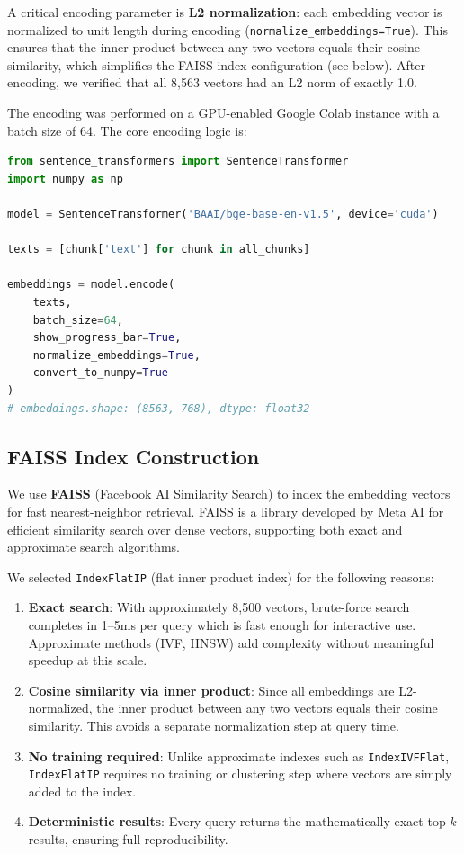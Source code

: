 \documentclass[10pt, letterpaper]{article}
\begin{document}
A critical encoding parameter is \textbf{L2 normalization}: each embedding vector is
normalized to unit length during encoding (\texttt{normalize\_embeddings=True}). This
ensures that the inner product between any two vectors equals their cosine similarity,
which simplifies the FAISS index configuration (see below). After encoding, we verified
that all 8,563 vectors had an L2 norm of exactly 1.0.

The encoding was performed on a GPU-enabled Google Colab instance with a batch size
of 64. The core encoding logic is:

\begin{lstlisting}[language=Python, caption=Encoding all chunks into normalized dense vectors]
from sentence_transformers import SentenceTransformer
import numpy as np

model = SentenceTransformer('BAAI/bge-base-en-v1.5', device='cuda')

texts = [chunk['text'] for chunk in all_chunks]

embeddings = model.encode(
    texts,
    batch_size=64,
    show_progress_bar=True,
    normalize_embeddings=True,
    convert_to_numpy=True
)
# embeddings.shape: (8563, 768), dtype: float32
\end{lstlisting}

\subsection{FAISS Index Construction}

We use \textbf{FAISS} (Facebook AI Similarity Search) to index the embedding vectors
for fast nearest-neighbor retrieval. FAISS is a library developed by Meta AI for
efficient similarity search over dense vectors, supporting both exact and approximate
search algorithms.

We selected \texttt{IndexFlatIP} (flat inner product index) for the following reasons:

\begin{enumerate}[noitemsep, topsep=4pt]
    \item \textbf{Exact search}: With approximately 8,500 vectors, brute-force search
          completes in 1--5ms per query which is fast enough for interactive use. Approximate
          methods (IVF, HNSW) add complexity without meaningful speedup at this scale.
    \item \textbf{Cosine similarity via inner product}: Since all embeddings are
          L2-normalized, the inner product between any two vectors equals their cosine
          similarity. This avoids a separate normalization step at query time.
    \item \textbf{No training required}: Unlike approximate indexes such as
          \texttt{IndexIVFFlat}, \texttt{IndexFlatIP} requires no training or clustering
          step where vectors are simply added to the index.
    \item \textbf{Deterministic results}: Every query returns the mathematically exact
          top-$k$ results, ensuring full reproducibility.
\end{enumerate}
\end{document}
